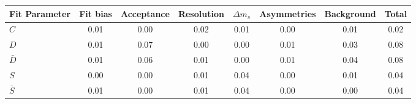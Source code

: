 \begin{tabular}{l  c  c  c  c  c  c  | c }
\hline
\hline
Fit Parameter & Fit bias & Acceptance & Resolution & $\Delta m_{s}$ & Asymmetries & Background &  Total  \\ 
\hline
$C$ & 0.01 & 0.00 & 0.02 & 0.01 & 0.00 & 0.01 & 0.02 \\ 
$D$ & 0.01 & 0.07 & 0.00 & 0.00 & 0.01 & 0.03 & 0.08 \\ 
$\bar{D}$ & 0.01 & 0.06 & 0.01 & 0.00 & 0.01 & 0.04 & 0.08 \\ 
$S$ & 0.00 & 0.00 & 0.01 & 0.04 & 0.00 & 0.01 & 0.04 \\ 
$\bar{S}$ & 0.01 & 0.00 & 0.01 & 0.04 & 0.00 & 0.00 & 0.04 \\ 
\hline
\hline
\end{tabular}
